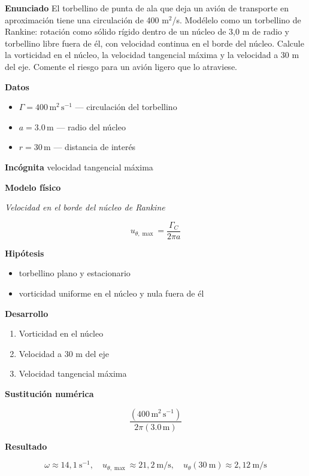 \documentclass[10pt,openany]{book}
\begin{document}
\begin{tcolorbox}[title={Problema resuelto}, studiumworked, breakable]

\noindent\textbf{Enunciado}
El torbellino de punta de ala que deja un avión de transporte en aproximación tiene una circulación de 400 m\(^2\)/s. Modélelo como un torbellino de Rankine: rotación como sólido rígido dentro de un núcleo de 3,0 m de radio y torbellino libre fuera de él, con velocidad continua en el borde del núcleo. Calcule la vorticidad en el núcleo, la velocidad tangencial máxima y la velocidad a 30 m del eje. Comente el riesgo para un avión ligero que lo atraviese.

\noindent\textbf{Datos}
\begin{itemize}
\item $\Gamma = 400\,\mathrm{m}^{2}\,\mathrm{s}^{-1}$ — circulación del torbellino
\item $a = 3.0\,\mathrm{m}$ — radio del núcleo
\item $r = 30\,\mathrm{m}$ — distancia de interés
\end{itemize}

\noindent\textbf{Incógnita}
velocidad tangencial máxima

\noindent\textbf{Modelo físico}

\noindent\textit{Velocidad en el borde del núcleo de Rankine}

\[
u_{\theta,\max} = \frac{\Gamma_C}{2\pi a}
\]

\noindent\textbf{Hipótesis}
\begin{itemize}
\item torbellino plano y estacionario
\item vorticidad uniforme en el núcleo y nula fuera de él
\end{itemize}

\noindent\textbf{Desarrollo}
\begin{enumerate}
\item
Vorticidad en el núcleo
\item
Velocidad a 30 m del eje
\item
Velocidad tangencial máxima
\end{enumerate}

\noindent\textbf{Sustitución numérica}

\[
\frac{\left(400\,\mathrm{m}^{2}\,\mathrm{s}^{-1}\right)}{2 \pi \left(3.0\,\mathrm{m}\right)}
\]

\noindent\textbf{Resultado}

\[
\omega \approx 14{,}1\ \mathrm{s^{-1}},\quad u_{\theta,\max} \approx 21{,}2\ \mathrm{m/s},\quad u_\theta(30\ \mathrm{m}) \approx 2{,}12\ \mathrm{m/s}
\]


\end{tcolorbox}
\end{document}

